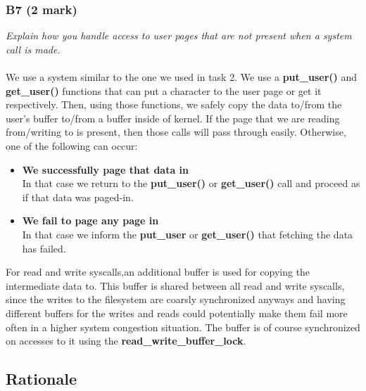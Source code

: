 \documentclass{report}
\newcommand{\question}[1]{\textit{#1} \ }
\newcommand{\bullpara}[2]{\item \textbf{#1} \ #2}
\newcommand{\fun}[1]{\textcolor{Emerald}{\textbf{#1}}}
\newcommand{\var}[1]{\textcolor{RoyalPurple}{\textbf{#1}}}
\newcommand{\compitem}[1]{\begin{itemize}\setlength\itemsep{-0.1em}#1\end{itemize}}
\begin{document}
			\subsubsection*{B7 (2 mark)}
				\question{Explain how you handle access to user pages that are not 
				present when a system call is made.}
				\\
				\\We use a system similar to the one we used in task 2.
				We use a \fun{put\_user()} and \fun{get\_user()} functions that
				can put a character to the user page or get it respectively. Then,
				using those functions, we safely copy the data to/from the user's buffer
				to/from a buffer inside of kernel. If the page that we are reading from/writing to
				is present, then those calls will pass through easily. Otherwise,
				one of the following can occur:
				\compitem{
					\bullpara{We successfully page that data in}{
					\\ In that case we return to the \fun{put\_user()} or \fun{get\_user()} call
					and proceed as if that data was paged-in.}
					\bullpara{We fail to page any page in}{
					\\ In that case we inform the \fun{put\_user{}} or \fun{get\_user()} that fetching
					the data has failed.}
				}
				For read and write syscalls,an additional buffer is used for copying the intermediate data to.
				This buffer is shared between all read and write syscalls, since the writes
				to the filesystem are coarsly synchronized anyways and having different buffers for the writes and reads
				could potentially make them fail more often in a higher system congestion situation. The buffer is of course
				synchronized on accesses to it using the \var{read\_write\_buffer\_lock}.
			
		\subsection*{Rationale}
\end{document}
